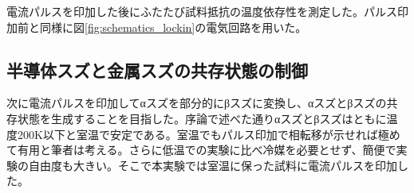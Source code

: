 
電流パルスを印加した後にふたたび試料抵抗の温度依存性を測定した。パルス印加前と同様に図\ref{fig:schematics_lockin}の電気回路を用いた。

\subsection{半導体スズと金属スズの共存状態の制御}
次に電流パルスを印加してαスズを部分的にβスズに変換し、αスズとβスズの共存状態を生成することを目指した。序論で述べた通りαスズとβスズはともに温度200K以下と室温で安定である。室温でもパルス印加で相転移が示せれば極めて有用と筆者は考える。さらに低温での実験に比べ冷媒を必要とせず、簡便で実験の自由度も大きい。そこで本実験では室温に保った試料に電流パルスを印加した。

